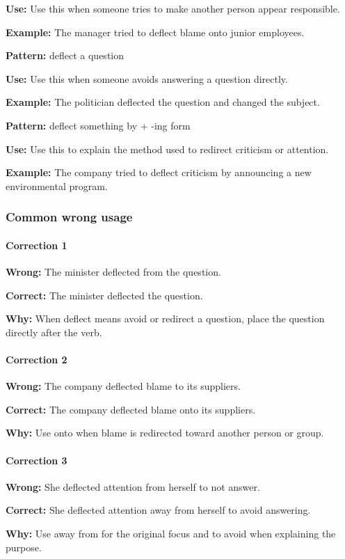\documentclass[11pt]{article}
\begin{document}
\textbf{Use:} Use this when someone tries to make another person appear responsible.

\textbf{Example:} The manager tried to deflect blame onto junior employees.

\textbf{Pattern:} deflect a question

\textbf{Use:} Use this when someone avoids answering a question directly.

\textbf{Example:} The politician deflected the question and changed the subject.

\textbf{Pattern:} deflect something by + -ing form

\textbf{Use:} Use this to explain the method used to redirect criticism or attention.

\textbf{Example:} The company tried to deflect criticism by announcing a new environmental program.

\subsubsection{Common wrong usage}
\paragraph{Correction 1}
\textbf{Wrong:} The minister deflected from the question.

\textbf{Correct:} The minister deflected the question.

\textbf{Why:} When deflect means avoid or redirect a question, place the question directly after the verb.

\paragraph{Correction 2}
\textbf{Wrong:} The company deflected blame to its suppliers.

\textbf{Correct:} The company deflected blame onto its suppliers.

\textbf{Why:} Use onto when blame is redirected toward another person or group.

\paragraph{Correction 3}
\textbf{Wrong:} She deflected attention from herself to not answer.

\textbf{Correct:} She deflected attention away from herself to avoid answering.

\textbf{Why:} Use away from for the original focus and to avoid when explaining the purpose.
\end{document}
